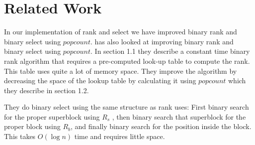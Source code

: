\section{Related Work}
In our implementation of rank and select we have improved binary rank and binary select using $popcount$.
\cite{Gonzalez05practicalimplementation} has also looked at improving binary rank and binary select using $popcount$. 
In section 1.1 they describe a constant time binary rank algorithm that requires a pre-computed look-up table to compute the rank. 
This table uses quite a lot of memory space. 
They improve the algorithm by decreasing the space of the lookup table by calculating it using $popcount$ which they describe in section 1.2. 

They do binary select using the same structure as rank uses: First binary search for the proper superblock using $R_s$ , then binary search that superblock for the proper block using $R_b$, and finally binary search for the position inside the block. 
This takes $O(\log n)$ time and requires little space.